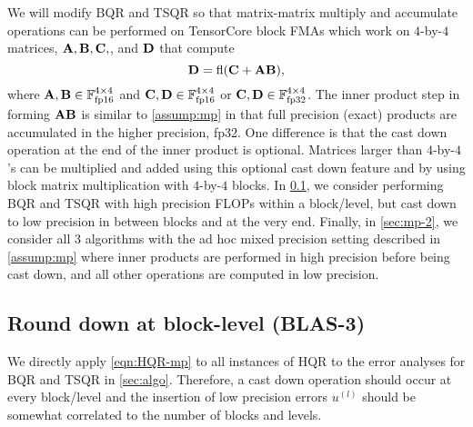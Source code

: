 We will modify BQR and TSQR so that matrix-matrix multiply and accumulate operations can be performed on TensorCore block FMAs which work on $4$-by-$4$ matrices, $\mathbf{A},\mathbf{B},\mathbf{C},$, and $\mathbf{D}$ that compute \[
\mathbf{D} = \mathrm{fl}( \mathbf{C} +\mathbf{A}\mathbf{B}),\]
where $\mathbf{A},\mathbf{B}\in \mathbb{F}_{\text{fp16}}^{4\times 4}$ and  $\mathbf{C},\mathbf{D}\in \mathbb{F}_{\text{fp16}}^{4\times 4}$ or $\mathbf{C},\mathbf{D}\in \mathbb{F}_{\text{fp32}}^{4\times 4}$.
The inner product step in forming $\mathbf{A}\mathbf{B}$ is similar to \cref{assump:mp} in that full precision (exact) products are accumulated in the higher precision, fp32.
One difference is that the cast down operation at the end of the inner product is optional.
Matrices larger than $4$-by-$4$'s can be multiplied and added using this optional cast down feature and by using block matrix multiplication with $4$-by-$4$ blocks.
In \cref{sec:mp-3}, we consider performing BQR and TSQR with high precision FLOPs within a block/level, but cast down to low precision in between blocks and at the very end.
Finally, in \cref{sec:mp-2}, we consider all 3 algorithms with the ad hoc mixed precision setting described in \cref{assump:mp} where inner products are performed in high precision before being cast down, and all other operations are computed in low precision.
\subsection{Round down at block-level (BLAS-3)}\label{sec:mp-3}
We directly apply \cref{eqn:HQR-mp} to all instances of HQR to the error analyses for BQR and TSQR in \cref{sec:algo}.
Therefore, a cast down operation should occur at every block/level and the insertion of low precision errors $u^{(l)}$ should be somewhat correlated to the number of blocks and levels. 

